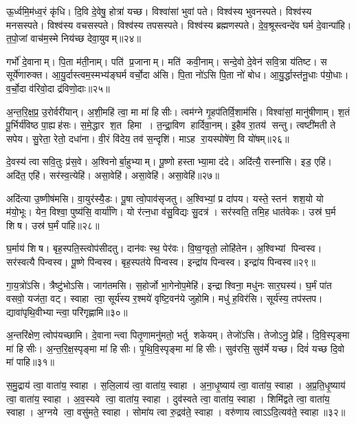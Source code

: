 ऊ॒र्ध्वमि॒म॑ध्व॒रं कृ॑धि। दि॒वि दे॒वेषु॒ होत्रा॑ यच्छ। विश्वा॑सां भुवां पते। विश्व॑स्य भुवनस्पते। विश्व॑स्य मनसस्पते। विश्व॑स्य वचसस्पते। विश्व॑स्य तपसस्पते। विश्व॑स्य ब्रह्मणस्पते। दे॒व॒श्रूस्त्वन्दे॑व घर्म दे॒वान्पा॑हि। त॒पो॒जां वाच॑म॒स्मे निय॑च्छ देवा॒युवम्॥२४॥

गर्भो॑ दे॒वानाम्। पि॒ता म॑ती॒नाम्। पति॑ प्र॒जानाम्। मति॑ कवी॒नाम्। सन्दे॒वो दे॒वेन॑ सवि॒त्रा य॑तिष्ट। स सूर्ये॑णारुक्त। आ॒यु॒र्दास्त्वम॒स्मभ्य॑ङ्घर्म वर्चो॒दा अ॑सि। पि॒ता नो॑ऽसि पि॒ता नो॑ बोध। आ॒यु॒र्द्धास्त॑नू॒धाः प॑यो॒धाः। व॒र्चो॒दा व॑रिवो॒दा द्र॑विणो॒दाः॥२५॥

अ॒न्त॒रि॒क्ष॒प्र॒ उ॒रोर्वरी॑यान्। अ॒शी॒महि॑ त्वा॒ मा मा॑ हिसीः। त्वम॑ग्ने गृ॒हप॑तिर्वि॒शाम॑सि। विश्वा॑सां॒ मानु॑षीणाम्। श॒तं पू॒र्भिर्य॑विष्ठ पा॒ह्यह॑सः। स॒मे॒द्धार श॒त हिमा। त॒न्द्रा॒विण हार्दिवा॒नम्। इ॒हैव रा॒तय॑ सन्तु। त्वष्टी॑मती ते सपेय। सु॒रेता॒ रेतो॒ दधा॑ना। वी॒रं  वि॑देय॒ तव॑ स॒न्दृशि॑। माऽह रा॒यस्पोषे॑ण॒ वि यो॑षम्॥२६॥
\anuvakamend[रो॒च॒ते॒ सूर्या॑य त्वा देवा॒युवं॑ द्रविणो॒दा दधा॑ना॒ द्वे च॑]


दे॒वस्य॑ त्वा सवि॒तुः प्र॑स॒वे। अ॒श्विनोर्बा॒हुभ्याम्। पू॒ष्णो हस्ताभ्या॒मा द॑दे। अदि॑त्यै॒ रास्ना॑सि। इड॒ एहि॑। अदि॑त॒ एहि॑। सर॑स्व॒त्येहि॑। असा॒वेहि॑। असा॒वेहि॑। असा॒वेहि॑॥२७॥

अदि॑त्या उ॒ष्णीष॑मसि। वा॒युर॑स्यै॒डः। पू॒षा त्वो॒पाव॑सृजतु। अ॒श्विभ्यां॒ प्र दा॑पय। यस्ते॒ स्तन॑ शश॒यो यो म॑यो॒भूः। येन॒ विश्वा॒ पुष्य॑सि॒ वार्या॑णि। यो र॑त्न॒धा व॑सु॒विद्यः सु॒दत्र॑। सर॑स्वति॒ तमि॒ह धात॑वेकः। उस्र॑ घ॒र्म शिष। उस्र॑ घ॒र्मं पा॑हि॥२८॥

घ॒र्माय॑ शिष। बृह॒स्पति॒स्त्वोप॑सीदतु। दान॑वः स्थ॒ पेर॑वः। वि॒ष्व॒ग्वृतो॒ लोहि॑तेन। अ॒श्विभ्यां पिन्वस्व। सर॑स्वत्यै पिन्वस्व। पू॒ष्णे पि॑न्वस्व। बृह॒स्पत॑ये पिन्वस्व। इन्द्रा॑य पिन्वस्व। इन्द्रा॑य पिन्वस्व॥२९॥

गा॒य॒त्रो॑ऽसि। त्रैष्टु॑भोऽसि। जाग॑तमसि। स॒होर्जो भा॒गेनोप॒मेहि॑। इन्द्राश्विना॒ मधु॑नः सार॒घस्य॑। घ॒र्मं पा॑त वसवो॒ यज॑ता॒ वट्। स्वाहा त्वा॒ सूर्य॑स्य र॒श्मये॑ वृष्टि॒वन॑ये जुहोमि। मधु॑ ह॒विर॑सि। सूर्य॑स्य॒ तप॑स्तप। द्यावा॑पृथि॒वीभ्यान्त्वा॒ परि॑गृह्णामि॥३०॥

अ॒न्तरि॑क्षेण॒ त्वोप॑यच्छामि। दे॒वानान्त्वा पितृ॒णामनु॑मतो॒ भर्तु शकेयम्। तेजो॑ऽसि। तेजोऽनु॒ प्रेहि॑। दि॒वि॒स्पृङ्मा मा॑ हिसीः। अ॒न्त॒रि॒क्ष॒स्पृङ्मा मा॑ हिसीः। पृ॒थि॒वि॒स्पृङ्मा मा॑ हिसीः। सुव॑रसि॒ सुव॑र्मे यच्छ। दिवं॑ यच्छ दि॒वो मा॑ पाहि॥३१॥
\anuvakamend[एहि॑ पाहि पिन्वस्व गृह्णामि॒ नव॑ च]

स॒मु॒द्राय॑ त्वा॒ वाता॑य॒ स्वाहा। स॒लि॒लाय॑ त्वा॒ वाता॑य॒ स्वाहा। अ॒ना॒धृ॒ष्याय॑ त्वा॒ वाता॑य॒ स्वाहा। अ॒प्र॒ति॒धृ॒ष्याय॑ त्वा॒ वाता॑य॒ स्वाहा। अ॒व॒स्यवे त्वा॒ वाता॑य॒ स्वाहा। दुव॑स्वते त्वा॒ वाता॑य॒ स्वाहा। शिमि॑द्वते त्वा॒ वाता॑य॒ स्वाहा। अ॒ग्नये त्वा॒ वसु॑मते॒ स्वाहा। सोमा॑य त्वा रु॒द्रव॑ते॒ स्वाहा। वरु॑णाय त्वाऽऽदि॒त्यव॑ते॒ स्वाहा॥३२॥

